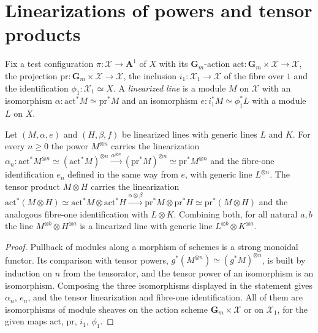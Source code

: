 \section{Linearizations of powers and tensor products}
\label{sec:native-tc-nef-fs-tensor-comparisons}

Fix a test configuration $\pi\colon\mathcal X\to\mathbf A^1$ of $X$ with its
$\mathbf G_m$-action $\mathrm{act}\colon\mathbf G_m\times\mathcal X\to\mathcal X$, the
projection $\mathrm{pr}\colon\mathbf G_m\times\mathcal X\to\mathcal X$, the inclusion
$i_1\colon\mathcal X_1\to\mathcal X$ of the fibre over $1$ and the identification
$\phi_1\colon\mathcal X_1\simeq X$.  A \emph{linearized line} is a module $M$ on
$\mathcal X$ with an isomorphism $\alpha\colon\mathrm{act}^*M\simeq\mathrm{pr}^*M$ and an
isomorphism $e\colon i_1^*M\simeq\phi_1^*L$ with a module $L$ on $X$.

\begin{lemma}
\label{lem:native-tc-nef-fs-whole-tensor-comparisons}
\leanok
{}
Let $(M,\alpha,e)$ and $(H,\beta,f)$ be linearized lines with generic lines $L$ and $K$.
For every $n\ge0$ the power $M^{\otimes n}$ carries the linearization
$\alpha_n\colon\mathrm{act}^*M^{\otimes n}\simeq(\mathrm{act}^*M)^{\otimes n}
\xrightarrow{\alpha^{\otimes n}}(\mathrm{pr}^*M)^{\otimes n}\simeq\mathrm{pr}^*M^{\otimes n}$
and the fibre-one identification $e_n$ defined in the same way from $e$, with generic line
$L^{\otimes n}$.  The tensor product $M\otimes H$ carries the linearization
$\mathrm{act}^*(M\otimes H)\simeq\mathrm{act}^*M\otimes\mathrm{act}^*H
\xrightarrow{\alpha\otimes\beta}\mathrm{pr}^*M\otimes\mathrm{pr}^*H\simeq\mathrm{pr}^*(M\otimes H)$
and the analogous fibre-one identification with $L\otimes K$.  Combining both, for all
natural $a,b$ the line $M^{\otimes b}\otimes H^{\otimes a}$ is a linearized line with
generic line $L^{\otimes b}\otimes K^{\otimes a}$.
\end{lemma}

\begin{proof}
Pullback of modules along a morphism of schemes is a strong monoidal functor.  Its
comparison with tensor powers, $g^*(M^{\otimes n})\simeq(g^*M)^{\otimes n}$, is built by
induction on $n$ from the tensorator, and the tensor power of an isomorphism is an
isomorphism.  Composing the three isomorphisms displayed in the statement gives
$\alpha_n$, $e_n$, and the tensor linearization and fibre-one identification.  All of
them are isomorphisms of module sheaves on the action scheme $\mathbf G_m\times\mathcal X$
or on $\mathcal X_1$, for the given maps $\mathrm{act}$, $\mathrm{pr}$, $i_1$, $\phi_1$.
\end{proof}
